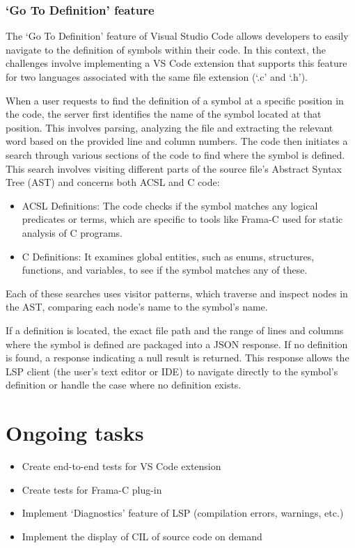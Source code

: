 \documentclass[10pt]{article}
\begin{document}
\begin{singlespace}
\section{`Go To Definition' feature}
The `Go To Definition' feature of Visual Studio Code allows developers to easily navigate to the definition of symbols within their code. In this context, the challenges involve implementing a VS Code extension that supports this feature for two languages associated with the same file extension (`.c' and `.h'). 

When a user requests to find the definition of a symbol at a specific position in the code, the server first identifies the name of the symbol located at that position. This involves parsing, analyzing the file and extracting the relevant word based on the provided line and column numbers.
The code then initiates a search through various sections of the code to find where the symbol is defined. This search involves visiting different parts of the source file's Abstract Syntax Tree (AST) and concerns both ACSL and C code:
\begin{itemize}
\item ACSL Definitions: The code checks if the symbol matches any logical predicates or terms, which are specific to tools like Frama-C used for static analysis of C programs.
\item C Definitions: It examines global entities, such as enums, structures, functions, and variables, to see if the symbol matches any of these.
\end{itemize}
Each of these searches uses visitor patterns, which traverse and inspect nodes in the AST, comparing each node's name to the symbol's name.

If a definition is located, the exact file path and the range of lines and columns where the symbol is defined are packaged into a JSON response. If no definition is found, a response indicating a null result is returned. This response allows the LSP client (the user's text editor or IDE) to navigate directly to the symbol's definition or handle the case where no definition exists.

\part{Ongoing tasks}
\begin{itemize}
	\item Create end-to-end tests for VS Code extension 
	\item Create tests for Frama-C plug-in
	\item Implement `Diagnostics' feature of LSP (compilation errors, warnings, etc.)
	\item Implement the display of CIL of source code on demand
\end{itemize}

\end{singlespace}
\end{document}
